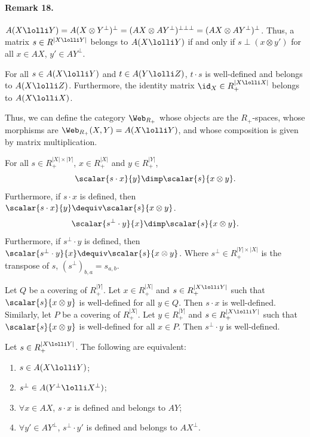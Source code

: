 \paragraph{Remark 18.} $A(X\lolli Y)=A(X\otimes Y^\perp)^\perp=(AX\otimes AY^\perp)^{\perp\perp\perp}=(AX\otimes AY^\perp)^\perp$. Thus, a matrix $s\in R^{|X\lolli Y|}$ belongs to $A(X\lolli Y)$ if and only if $s\perp(x\otimes y')$ for all $x\in AX$, $y'\in AY^\perp$.
\begin{originalthm}[19] For all $s\in A(X\lolli Y)$ and $t\in A(Y\lolli Z)$, $t\cdot s$ is well-defined and belongs to $A(X\lolli Z)$. Furthermore, the identity matrix $\id_X\in R_+^{|X\lolli X|}$ belongs to $A(X\lolli X)$.\end{originalthm}
Thus, we can define the category $\Web_{R_+}$ whose objects are the $R_+$-spaces, whose morphisms are $\Web_{R_+}(X,Y)=A(X\lolli Y)$, and whose composition is given by matrix multiplication.
\begin{originallemma}[20] For all $s\in R_+^{|X|\times|Y|}$, $x\in R_+^{|X|}$ and $y\in R_+^{|Y|}$,
\[\scalar{s\cdot x}{y}\dimp\scalar{s}{x\otimes y}.\]
Furthermore, if $s\cdot x$ is defined, then $\scalar{s\cdot x}{y}\dequiv\scalar{s}{x\otimes y}$.
\[\scalar{s^\perp\cdot y}{x}\dimp\scalar{s}{x\otimes y}.\]
Furthermore, if $s^\perp\cdot y$ is defined, then $\scalar{s^\perp\cdot y}{x}\dequiv\scalar{s}{x\otimes y}$. Where $s^\perp\in R_+^{|Y|\times|X|}$ is the transpose of $s$, $(s^\perp)_{b,a}=s_{a,b}$.
\end{originallemma}
\begin{originallemma} Let $Q$ be a covering of $R_+^{|Y|}$. Let $x\in R_+^{|X|}$ and $s\in R_+^{|X\lolli Y|}$ such that $\scalar{s}{x\otimes y}$ is well-defined for all $y\in Q$. Then $s\cdot x$ is well-defined. Similarly, let $P$ be a covering of $R_+^{|X|}$. Let $y\in R_+^{|Y|}$ and $s\in R_+^{|X\lolli Y|}$ such that $\scalar{s}{x\otimes y}$ is well-defined for all $x\in P$. Then $s^\perp\cdot y$ is well-defined.\end{originallemma}
\begin{originalprop}[22] Let $s\in R_+^{|X\lolli Y|}$. The following are equivalent:
\begin{enumerate}\item $s\in A(X\lolli Y)$;\item $s^\perp\in A(Y^\perp\lolli X^\perp)$;\item $\forall x\in AX$, $s\cdot x$ is defined and belongs to $AY$;\item $\forall y'\in AY^\perp$, $s^\perp\cdot y'$ is defined and belongs to $AX^\perp$.\end{enumerate}
\end{originalprop}
